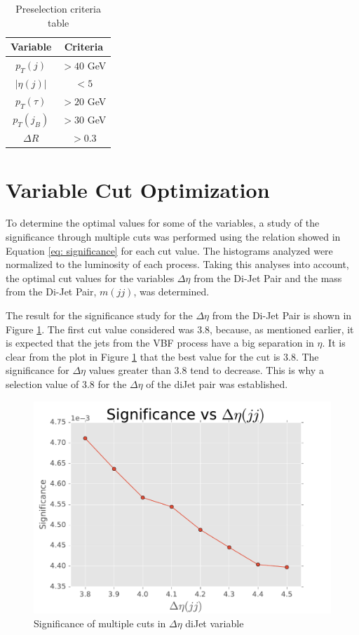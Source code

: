\begin{table}
\centering
\begin{tabular}{|c|c|}
\hline
Variable & Criteria \\
\hline
$p_{T}(j)$ & $> 40$ GeV \\
$|\eta(j)|$ & $< 5$ \\ 
$p_{T}(\tau)$ & $> 20$ GeV \\
$p_{T}(j_{B})$ & $>30$ GeV \\
$\Delta R$ & $>0.3$ \\
\hline
\end{tabular}
\caption{Preselection criteria table}
\label{table: preselection}
\end{table}

\section{Variable Cut Optimization}

To determine the optimal values for some of the variables, a study of the significance through multiple cuts was performed using the relation showed in Equation \ref{eq: significance} for each cut value. The histograms analyzed were normalized to the luminosity of each process. Taking this analyses into account, the optimal cut values for the variables $\Delta \eta$ from the Di-Jet Pair and the mass from the Di-Jet Pair, $m(jj)$, was determined.

The result for the significance study for the $\Delta \eta$ from the Di-Jet Pair is shown in Figure \ref{fig: significanceDeltaEta}. The first cut value considered was 3.8, because, as mentioned earlier, it is expected that the jets from the VBF process have a big separation in $\eta$. It is clear from the plot in Figure \ref{fig: significanceDeltaEta} that the best value for the cut is 3.8. The significance for $\Delta \eta$ values greater than 3.8 tend to decrease. This is why a selection value of 3.8 for the $\Delta \eta$ of the diJet pair was established.

\begin{figure}[H]
\centering
\includegraphics[width = \linewidth]{significance_deltaEta}
\caption{Significance of multiple cuts in $\Delta \eta$ diJet variable}
\label{fig: significanceDeltaEta}
\end{figure}

